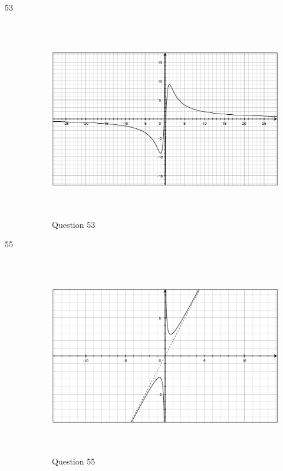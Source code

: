 \documentclass[fleqn,addpoints]{exam}
\begin{document}
\begin{description}
\item[53]
\begin{figure}[H]
  \centering
  \includegraphics[width=12.25cm,height=8.75cm]{question53.eps}
  \caption*{Question 53}
\end{figure}

\item[55]
\begin{figure}[H]
  \centering
  \includegraphics[width=12.25cm,height=8.75cm]{question55.eps}
  \caption*{Question 55}
\end{figure}


\end{description}
\end{document}
